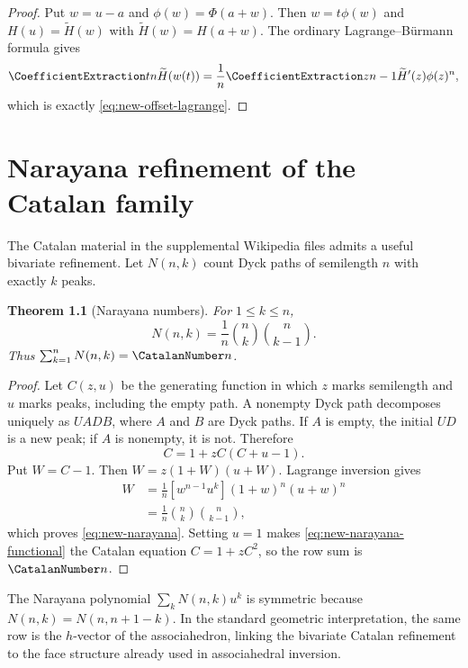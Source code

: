 \documentclass[11pt,a4paper,oneside,openany]{book}
\newtheorem{theorem}{Theorem}[chapter]
\theoremstyle{definition}
\theoremstyle{remark}
\begin{document}
\begin{proof}
Put $w=u-a$ and $\phi(w)=\Phi(a+w)$.  Then $w=t\phi(w)$ and
$H(u)=\widetilde H(w)$ with $\widetilde H(w)=H(a+w)$.  The ordinary
Lagrange--Bürmann formula gives
\[
 \CoefficientExtraction t n\widetilde H(w(t))
 =\frac1n\CoefficientExtraction z{n-1}\widetilde H'(z)\phi(z)^n,
\]
which is exactly \eqref{eq:new-offset-lagrange}.
\end{proof}

\chapter{Narayana refinement of the Catalan family}
\label{ch:narayana}

The Catalan material in the supplemental Wikipedia files admits a useful
bivariate refinement.  Let $N(n,k)$ count Dyck paths of semilength $n$ with
exactly $k$ peaks.

\begin{theorem}[Narayana numbers]\label{thm:new-narayana}
For $1\le k\le n$,
\begin{equation}\label{eq:new-narayana}
 \boxed{\displaystyle
 N(n,k)=\frac1n\binom nk\binom n{k-1}.}
\end{equation}
Thus $\sum_{k=1}^nN(n,k)=\CatalanNumber n$.
\end{theorem}

\begin{proof}
Let $C(z,u)$ be the generating function in which $z$ marks semilength and
$u$ marks peaks, including the empty path.  A nonempty Dyck path decomposes
uniquely as $UADB$, where $A$ and $B$ are Dyck paths.  If $A$ is empty, the
initial $UD$ is a new peak; if $A$ is nonempty, it is not.  Therefore
\begin{equation}\label{eq:new-narayana-functional}
 C=1+zC(C+u-1).
\end{equation}
Put $W=C-1$.  Then
$W=z(1+W)(u+W)$.  Lagrange inversion gives
\begin{align*}
 [z^nu^k]W
 &=\frac1n[w^{n-1}u^k](1+w)^n(u+w)^n\\
 &=\frac1n\binom nk\binom n{k-1},
\end{align*}
which proves \eqref{eq:new-narayana}.  Setting $u=1$ makes
\eqref{eq:new-narayana-functional} the Catalan equation $C=1+zC^2$, so the
row sum is $\CatalanNumber n$.
\end{proof}

The Narayana polynomial $\sum_kN(n,k)u^k$ is symmetric because
$N(n,k)=N(n,n+1-k)$.  In the standard geometric interpretation, the same row
is the $h$-vector of the associahedron, linking the bivariate Catalan
refinement to the face structure already used in associahedral inversion.
\end{document}
